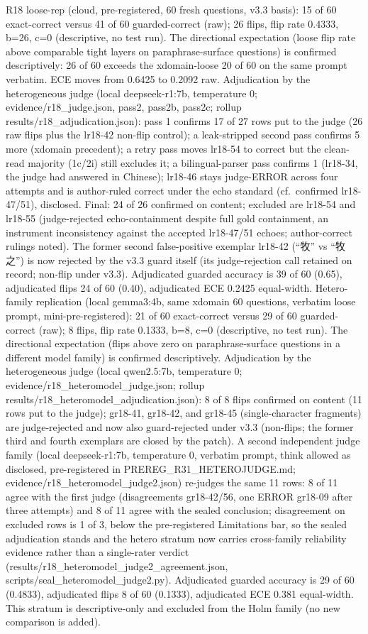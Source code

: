 \documentclass[10pt]{article} %
\begin{document}
R18 loose-rep (cloud, pre-registered, 60 fresh questions, v3.3 basis): 15 of 60 exact-correct versus 41 of 60 guarded-correct (raw); 26 flips, flip rate 0.4333, b=26, c=0 (descriptive, no test run). The directional expectation (loose flip rate above comparable tight layers on paraphrase-surface questions) is confirmed descriptively: 26 of 60 exceeds the xdomain-loose 20 of 60 on the same prompt verbatim. ECE moves from 0.6425 to 0.2092 raw. Adjudication by the heterogeneous judge (local deepseek-r1:7b, temperature 0; evidence/r18\_judge.json, pass2, pass2b, pass2c; rollup results/r18\_adjudication.json): pass 1 confirms 17 of 27 rows put to the judge (26 raw flips plus the lr18-42 non-flip control); a leak-stripped second pass confirms 5 more (xdomain precedent); a retry pass moves lr18-54 to correct but the clean-read majority (1c/2i) still excludes it; a bilingual-parser pass confirms 1 (lr18-34, the judge had answered in Chinese); lr18-46 stays judge-ERROR across four attempts and is author-ruled correct under the echo standard (cf.\ confirmed lr18-47/51), disclosed. Final: 24 of 26 confirmed on content; excluded are lr18-54 and lr18-55 (judge-rejected echo-containment despite full gold containment, an instrument inconsistency against the accepted lr18-47/51 echoes; author-correct rulings noted). The former second false-positive exemplar lr18-42 (``牧'' vs ``牧之'') is now rejected by the v3.3 guard itself (its judge-rejection call retained on record; non-flip under v3.3). Adjudicated guarded accuracy is 39 of 60 (0.65), adjudicated flips 24 of 60 (0.40), adjudicated ECE 0.2425 equal-width. Hetero-family replication (local gemma3:4b, same xdomain 60 questions, verbatim loose prompt, mini-pre-registered): 21 of 60 exact-correct versus 29 of 60 guarded-correct (raw); 8 flips, flip rate 0.1333, b=8, c=0 (descriptive, no test run). The directional expectation (flips above zero on paraphrase-surface questions in a different model family) is confirmed descriptively. Adjudication by the heterogeneous judge (local qwen2.5:7b, temperature 0; evidence/r18\_heteromodel\_judge.json; rollup results/r18\_heteromodel\_adjudication.json): 8 of 8 flips confirmed on content (11 rows put to the judge); gr18-41, gr18-42, and gr18-45 (single-character fragments) are judge-rejected and now also guard-rejected under v3.3 (non-flips; the former third and fourth exemplars are closed by the patch). A second independent judge family (local deepseek-r1:7b, temperature 0, verbatim prompt, think allowed as disclosed, pre-registered in PREREG\_R31\_HETEROJUDGE.md; evidence/r18\_heteromodel\_judge2.json) re-judges the same 11 rows: 8 of 11 agree with the first judge (disagreements gr18-42/56, one ERROR gr18-09 after three attempts) and 8 of 11 agree with the sealed conclusion; disagreement on excluded rows is 1 of 3, below the pre-registered Limitations bar, so the sealed adjudication stands and the hetero stratum now carries cross-family reliability evidence rather than a single-rater verdict (results/r18\_heteromodel\_judge2\_agreement.json, scripts/seal\_heteromodel\_judge2.py). Adjudicated guarded accuracy is 29 of 60 (0.4833), adjudicated flips 8 of 60 (0.1333), adjudicated ECE 0.381 equal-width. This stratum is descriptive-only and excluded from the Holm family (no new comparison is added).
\end{document}
